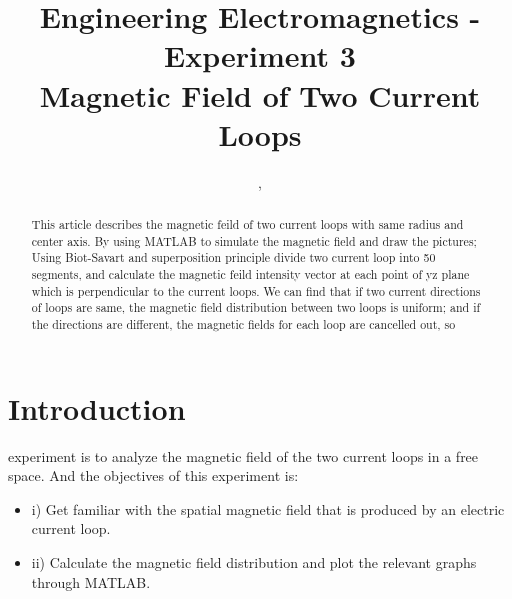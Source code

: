 \documentclass[10pt, journal, final]{IEEEtran}
\begin{document}
\title{Engineering Electromagnetics - Experiment 3\\ Magnetic Field of Two Current Loops}
\author{,
    \\
}

\maketitle

\begin{abstract}
    This article describes the magnetic feild of two current loops with same radius and center axis.
    By using MATLAB to simulate the magnetic field and draw the pictures; Using Biot-Savart and superposition principle
    divide two current loop into 50 segments, and calculate the magnetic feild intensity vector at each point of
    yz plane which is perpendicular to the current loops. We can find that if two current directions of loops are same,
    the magnetic field distribution between two loops is uniform; and if the directions are different, 
    the magnetic fields for each loop are cancelled out, so   
    
\end{abstract}

\section{
  Introduction
 }
\label{sec:Intro}

 experiment is to analyze the magnetic field of
the two current loops in a free space. And the objectives of this experiment is:
\begin{itemize}
    \item i) Get familiar with the spatial magnetic field that is produced by an electric current loop.
    \item ii) Calculate the magnetic field distribution and plot the relevant graphs through MATLAB.
\end{itemize}
\end{document}
